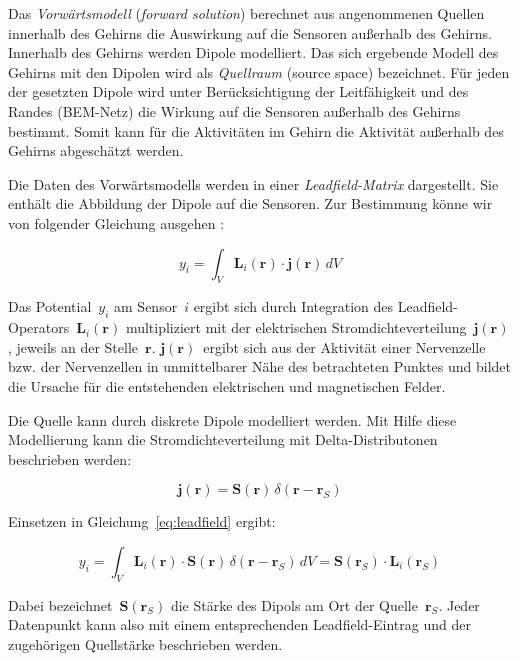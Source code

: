 \documentclass[doc,a4paper,12pt]{apa6}
\newcommand{\mx}[1]{\mathbf{#1}}
\begin{document}
Das \emph{Vorwärtsmodell} (\emph{forward solution}) berechnet aus angenommenen Quellen innerhalb des Gehirns die Auswirkung auf die Sensoren außerhalb des Gehirns. Innerhalb des Gehirns werden Dipole modelliert. Das sich ergebende Modell des Gehirns mit den Dipolen wird als \emph{Quellraum} (source space) bezeichnet. Für jeden der gesetzten Dipole wird unter Berücksichtigung der Leitfähigkeit und des Randes (BEM-Netz) die Wirkung auf die Sensoren außerhalb des Gehirns bestimmt. Somit kann für die Aktivitäten im Gehirn die Aktivität außerhalb des Gehirns abgeschätzt werden.

Die Daten des Vorwärtsmodells werden in einer \emph{Leadfield-Matrix} dargestellt. Sie enthält die Abbildung der Dipole auf die Sensoren. Zur Bestimmung könne wir von folgender Gleichung ausgehen \parencite{maurits2011neurology}:

\begin{equation}
y_i = \int_V \mx{L}_i (\mx{r}) \cdot \mx{j} (\mx{r})\, dV
\label{eq:leadfield}
\end{equation}

Das Potential~$y_i$ am Sensor~$i$ ergibt sich durch Integration des Leadfield-Operators~$\mx{L}_i(\mx{r})$ multipliziert mit der elektrischen Stromdichteverteilung~$\mx{j}(\mx{r})$, jeweils an der Stelle~$\mx{r}$. $\mx{j}(\mx{r})$~ergibt sich aus der Aktivität einer Nervenzelle bzw. der Nervenzellen in unmittelbarer Nähe des betrachteten Punktes und bildet die Ursache für die entstehenden elektrischen und magnetischen Felder.

Die Quelle kann durch diskrete Dipole modelliert werden. Mit Hilfe diese Modellierung kann die Stromdichteverteilung mit Delta-Distributonen beschrieben werden:

\begin{equation}
\mx{j} (\mx{r}) = \mx{S}(\mx{r})\,\delta(\mx{r}-\mx{r}_S)
\end{equation}

Einsetzen in Gleichung~\ref{eq:leadfield} ergibt:

\begin{equation}
y_i = \int_V \mx{L}_i (\mx{r}) \cdot \mx{S}(\mx{r})\,\delta(\mx{r}-\mx{r}_S)\, dV = \mx{S}(\mx{r}_S) \cdot \mx{L}_i(\mx{r}_S)
\label{eq:leadfield2}
\end{equation}

Dabei bezeichnet~$\mx{S}(\mx{r}_S)$ die Stärke des Dipols am Ort der Quelle~$\mx{r}_S$. Jeder Datenpunkt kann also mit einem entsprechenden Leadfield-Eintrag und der zugehörigen Quellstärke beschrieben werden.
\end{document}
